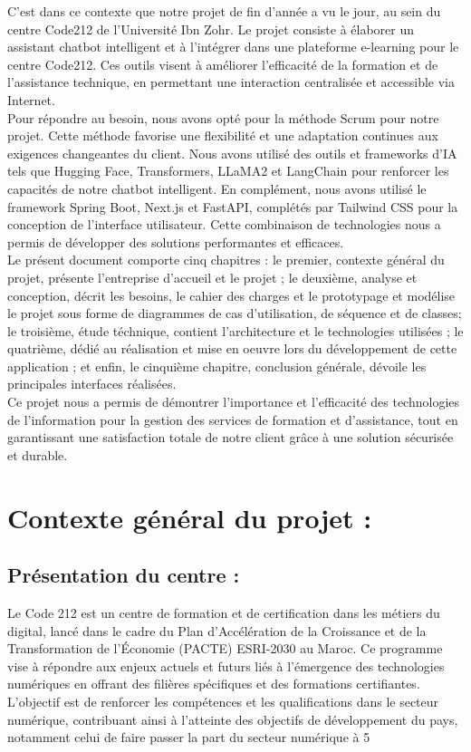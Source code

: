 \documentclass[a4paper, 11pt, openany]{report}
\begin{document}
C’est dans ce contexte que notre projet de fin d’année a vu le jour, au sein du centre Code212 de l’Université Ibn Zohr. Le projet consiste à élaborer un assistant chatbot intelligent et à l'intégrer dans une plateforme e-learning pour le centre Code212. Ces outils visent à améliorer l’efficacité de la formation et de l'assistance technique, en permettant une interaction centralisée et accessible via Internet.
\\

Pour répondre au besoin, nous avons opté pour la méthode Scrum pour notre projet. Cette méthode favorise une flexibilité et une adaptation continues aux exigences changeantes du client. Nous avons utilisé des outils et frameworks d'IA tels que Hugging Face, Transformers, LLaMA2 et LangChain pour renforcer les capacités de notre chatbot intelligent. En complément, nous avons utilisé le framework Spring Boot, Next.js et FastAPI, complétés par Tailwind CSS pour la conception de l’interface utilisateur. Cette combinaison de technologies nous a permis de développer des solutions performantes et efficaces. 
\\

Le présent document comporte cinq chapitres : le premier, contexte général du projet, présente l’entreprise d’accueil et le projet ; le deuxième, analyse et conception, décrit les besoins, le cahier des charges et le prototypage et modélise le projet sous forme de diagrammes de cas d’utilisation, de séquence et de classes; le troisième, étude téchnique, contient l'architecture et le technologies utilisées ; le quatrième, dédié au réalisation et mise en oeuvre lors du développement de cette application ; et enfin, le cinquième chapitre, conclusion générale, dévoile les principales interfaces réalisées.
\\

Ce projet nous a permis de démontrer l'importance et l’efficacité des technologies de l'information pour la gestion des services de formation et d’assistance, tout en garantissant une satisfaction totale de notre client grâce à une solution sécurisée et durable.







\chapter{Contexte général du projet :}
\section{Présentation du centre :}
Le Code 212 est un centre de formation et de certification dans les métiers du digital, lancé dans le cadre du Plan d'Accélération de la Croissance et de la Transformation de l'Économie (PACTE) ESRI-2030 au Maroc. Ce programme vise à répondre aux enjeux actuels et futurs liés à l'émergence des technologies numériques en offrant des filières spécifiques et des formations certifiantes. L'objectif est de renforcer les compétences et les qualifications dans le secteur numérique, contribuant ainsi à l'atteinte des objectifs de développement du pays, notamment celui de faire passer la part du secteur numérique à 5%
\end{document}
